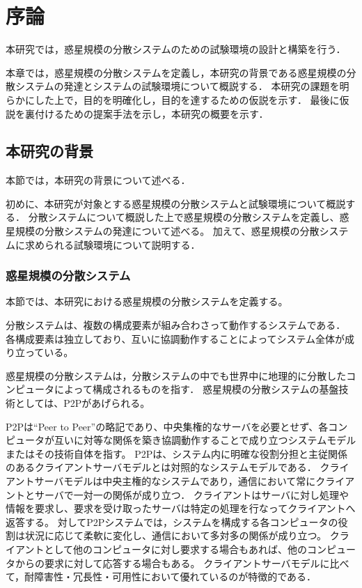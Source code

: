 \chapter{序論}
\label{introduction}

本研究では，惑星規模の分散システムのための試験環境の設計と構築を行う．

本章では，惑星規模の分散システムを定義し，本研究の背景である惑星規模の分散システムの発達とシステムの試験環境について概説する．
本研究の課題を明らかにした上で，目的を明確化し，目的を達するための仮説を示す．
最後に仮説を裏付けるための提案手法を示し，本研究の概要を示す．

\section{本研究の背景}
\label{introduction:background}

本節では，本研究の背景について述べる．

初めに、本研究が対象とする惑星規模の分散システムと試験環境について概説する．
分散システムについて概説した上で惑星規模の分散システムを定義し、惑星規模の分散システムの発達について述べる。
加えて、惑星規模の分散システムに求められる試験環境について説明する．

\subsection{惑星規模の分散システム}

本節では、本研究における惑星規模の分散システムを定義する。

分散システムは、複数の構成要素が組み合わさって動作するシステムである．
各構成要素は独立しており、互いに協調動作することによってシステム全体が成り立っている。

惑星規模の分散システムは，分散システムの中でも世界中に地理的に分散したコンピュータによって構成されるものを指す．
惑星規模の分散システムの基盤技術としては、P2Pがあげられる。

P2Pは``Peer to Peer''の略記であり、中央集権的なサーバを必要とせず、各コンピュータが互いに対等な関係を築き協調動作することで成り立つシステムモデルまたはその技術自体を指す。
P2Pは、システム内に明確な役割分担と主従関係のあるクライアントサーバモデルとは対照的なシステムモデルである．
クライアントサーバモデルは中央主権的なシステムであり，通信において常にクライアントとサーバで一対一の関係が成り立つ．
クライアントはサーバに対し処理や情報を要求し、要求を受け取ったサーバは特定の処理を行なってクライアントへ返答する。
対してP2Pシステムでは，システムを構成する各コンピュータの役割は状況に応じて柔軟に変化し、通信において多対多の関係が成り立つ。
クライアントとして他のコンピュータに対し要求する場合もあれば、他のコンピュータからの要求に対して応答する場合もある。
クライアントサーバモデルに比べて，耐障害性・冗長性・可用性において優れているのが特徴的である．

